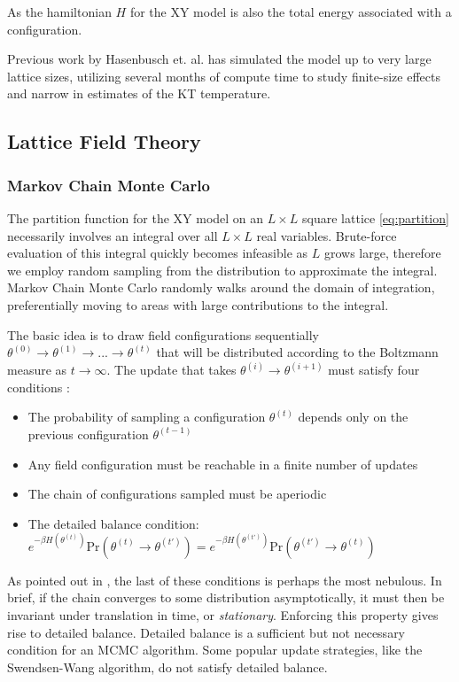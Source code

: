\documentclass[12pt]{article}
\begin{document}
As the hamiltonian $H$ for the XY model is also the total energy associated with a configuration.

Previous work by Hasenbusch et. al. \cite{Hasenbusch_2005} has simulated the model up to very large lattice sizes, utilizing several months of compute
time to study finite-size effects and narrow in estimates of the KT temperature. 

\subsection{Lattice Field Theory}

\subsubsection{Markov Chain Monte Carlo}

The partition function for the XY model on an $L\times L$ square lattice \ref{eq:partition} necessarily involves an integral over all $L\times L$ real variables.
Brute-force evaluation of this integral quickly becomes infeasible as $L$ grows large, therefore we employ random sampling from the distribution to approximate
the integral. Markov Chain Monte Carlo randomly walks around the domain of integration, preferentially moving to areas with large contributions to the integral.

The basic idea is to draw field configurations sequentially $\theta^{(0)} \rightarrow \theta^{(1)} \rightarrow ... \rightarrow \theta^{(t)}$ that will be
distributed according to the Boltzmann measure as $t\rightarrow\infty$. The update that takes $\theta^{(i)}\rightarrow\theta^{(i+1)}$ must satisfy four conditions \cite{hanada2018markovchainmontecarlo}:

\begin{itemize}
	\item The probability of sampling a configuration $\theta^{(t)}$ depends only on the previous configuration $\theta^{(t-1)}$
	\item Any field configuration must be reachable in a finite number of updates
	\item The chain of configurations sampled must be aperiodic
	\item The detailed balance condition: $e^{-\beta H(\theta^{(t)})}\text{Pr}(\theta^{(t)}\rightarrow\theta^{(t')})=e^{-\beta H(\theta^{(t')})}\text{Pr}(\theta^{(t')}\rightarrow\theta^{(t)})$
\end{itemize}

As pointed out in \cite{hanada2018markovchainmontecarlo}, the last of these conditions is perhaps the most nebulous. In brief, if the chain converges to some
distribution asymptotically, it must then be invariant under translation in time, or \textit{stationary}. Enforcing this property gives rise to detailed balance.
Detailed balance is a sufficient but not necessary condition for an MCMC algorithm. Some popular update strategies, like the Swendsen-Wang algorithm, do not
satisfy detailed balance.
\end{document}
